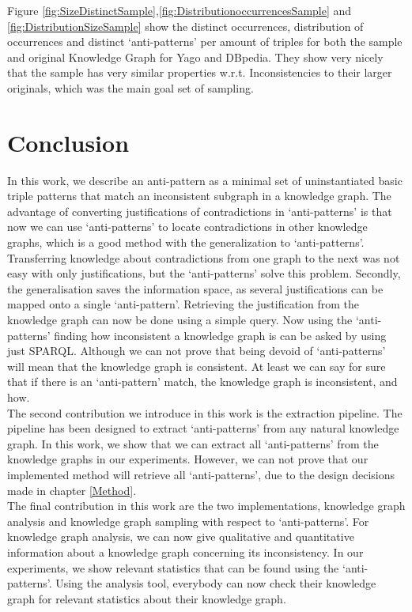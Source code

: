 \documentclass[11pt,letterpaper ,oneside ]{book}
\begin{document}
	
	
	
	
	
	Figure \ref{fig:SizeDistinctSample},\ref{fig:DistributionoccurrencesSample} and \ref{fig:DistributionSizeSample} show the distinct occurrences, distribution of occurrences and distinct `anti-patterns' per amount of triples for both the sample and original Knowledge Graph for Yago and DBpedia. They show very nicely that the sample has very similar properties w.r.t. Inconsistencies to their larger originals, which was the main goal set of sampling. 
	
	
	\newpage
	
	\chapter{Conclusion}\label{Conclusion}
	In this work, we describe an anti-pattern as a minimal set of uninstantiated basic triple patterns that match an inconsistent subgraph in a knowledge graph. The advantage of converting justifications of contradictions in `anti-patterns' is that now we can use `anti-patterns' to locate contradictions in other knowledge graphs, which is a good method with the generalization to `anti-patterns'. Transferring knowledge about contradictions from one graph to the next was not easy with only justifications, but the `anti-patterns' solve this problem. 
	Secondly, the generalisation saves the information space, as several justifications can be mapped onto a single `anti-pattern'. Retrieving the justification from the knowledge graph can now be done using a simple query. Now using the `anti-patterns' finding how inconsistent a knowledge graph is can be asked by using just SPARQL. Although we can not prove that being devoid of `anti-patterns' will mean that the knowledge graph is consistent. At least we can say for sure that if there is an `anti-pattern' match, the knowledge graph is inconsistent, and how.  \\
	
	The second contribution we introduce in this work is the extraction pipeline. The pipeline has been designed to extract `anti-patterns' from any natural knowledge graph. In this work, we show that we can extract all `anti-patterns' from the knowledge graphs in our experiments. However, we can not prove that our implemented method will retrieve all `anti-patterns', due to the design decisions made in chapter \ref{Method}.\\ 
	
	The final contribution in this work are the two implementations, knowledge graph analysis and knowledge graph sampling with respect to `anti-patterns'. For knowledge graph analysis, we can now give qualitative and quantitative information about a knowledge graph concerning its inconsistency. In our experiments, we show relevant statistics that can be found using the `anti-patterns'. Using the analysis tool, everybody can now check their knowledge graph for relevant statistics about their knowledge graph. \\
	
\end{document}

